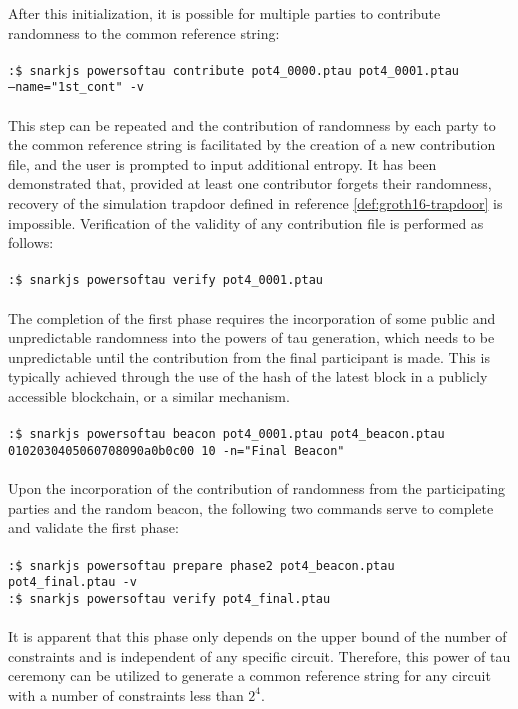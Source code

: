 \begin{example}
After this initialization, it is possible for multiple parties to contribute randomness to the common reference string:
\\
\\
\texttt{:\$ snarkjs powersoftau contribute pot4\_0000.ptau pot4\_0001.ptau \\--name="1st\_cont" -v}
\\
\\
This step can be repeated and the contribution of randomness by each party to the common reference string is facilitated by the creation of a new contribution file, and the user is prompted to input additional entropy. It has been demonstrated that, provided at least one contributor forgets their randomness, recovery of the simulation trapdoor defined in reference \ref{def:groth16-trapdoor} is impossible. Verification of the validity of any contribution file is performed as follows:
\\
\\
\texttt{:\$ snarkjs powersoftau verify pot4\_0001.ptau}
\\
\\
The completion of the first phase requires the incorporation of some public and unpredictable randomness into the powers of tau generation, which needs to be unpredictable until the contribution from the final participant is made. This is typically achieved through the use of the hash of the latest block in a publicly accessible blockchain, or a similar mechanism.
\\
\\
\texttt{:\$ snarkjs powersoftau beacon pot4\_0001.ptau pot4\_beacon.ptau \\ 0102030405060708090a0b0c00 10 -n="Final Beacon"}
\\
\\
Upon the incorporation of the contribution of randomness from the participating parties and the random beacon, the following two commands serve to complete and validate the first phase:
\\
\\
\texttt{:\$ snarkjs powersoftau prepare phase2 pot4\_beacon.ptau \\ pot4\_final.ptau -v}\\
\texttt{:\$ snarkjs powersoftau verify pot4\_final.ptau}
\\
\\
It is apparent that this phase only depends on the upper bound of the number of constraints and is independent of any specific circuit. Therefore, this power of tau ceremony can be utilized to generate a common reference string for any circuit with a number of constraints less than $2^4$.


\end{example}
